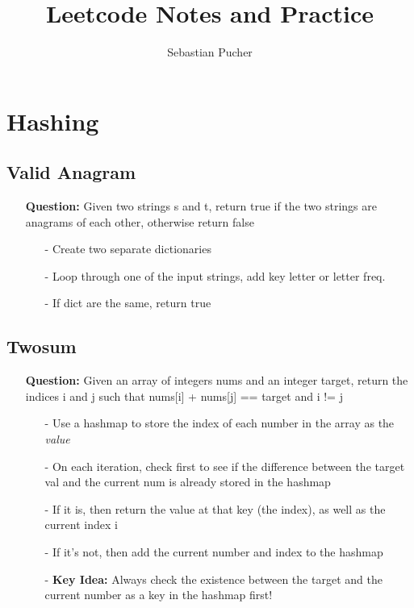 \documentclass[12pt]{article}
\title{Leetcode Notes and Practice}
\author{Sebastian Pucher}
\begin{document}
\maketitle                             


\tableofcontents

\newpage

\section{Hashing}
\subsection{Valid Anagram}
\begin{enumerate}
  \item[] \textbf{Question:} Given two strings s and t, return true if the two strings are anagrams of each other, otherwise return false
    \begin{enumerate}
      \item[-] Create two separate dictionaries
      \item[-] Loop through one of the input strings, add key letter or letter freq.
      \item[-] If dict are the same, return true
    \end{enumerate}
\end{enumerate}

\subsection{Twosum}
\begin{enumerate}
  \item[] \textbf{Question:} Given an array of integers nums and an integer target, return the indices i and j such that nums[i] + nums[j] == target and i != j
    \begin{enumerate}
      \item[-] Use a hashmap to store the index of each number in the array as the \textit{value}
      \item[-] On each iteration, check first to see if the difference between the target val and the current num is already stored in the hashmap
      \item[-] If it is, then return the value at that key (the index), as well as the current index i
      \item[-] If it's not, then add the current number and index to the hashmap 
      \item[-] \textbf{Key Idea: } Always check the existence between the target and the current number as a key in the hashmap first!
    \end{enumerate}
\end{enumerate}
\end{document}
